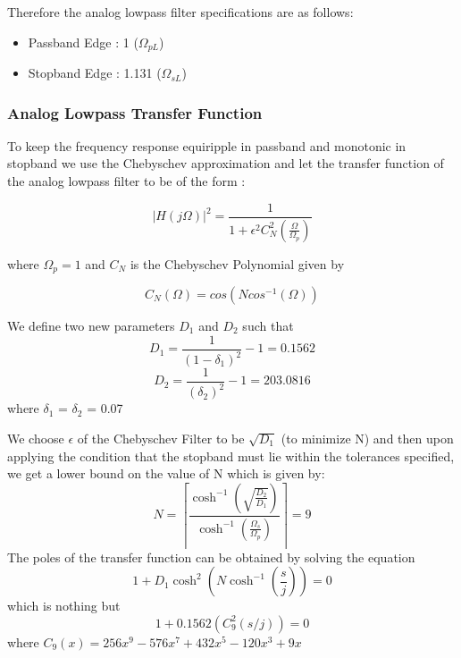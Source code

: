 \documentclass{article}
\begin{document}
\vspace{1em}
\noindent
Therefore the analog lowpass filter specifications are as follows:
\begin{itemize}
    \item Passband Edge : 1 ($\Omega_{pL}$)
    \item Stopband Edge : 1.131 ($\Omega_{sL}$)
\end{itemize}

\subsubsection{Analog Lowpass Transfer Function}
To keep the frequency response equiripple in passband and monotonic in stopband we use the Chebyschev approximation and let the transfer function of the analog lowpass filter to be of the form : 

\begin{equation*}
    |H(j\Omega)|^2 = \frac{1}{1 + \epsilon^2C^2_{N}(\frac{\Omega}{\Omega_p})}
\end{equation*}

where $\Omega_p = 1$ and $C_N$ is the Chebyschev Polynomial given by

\begin{equation*}
    C_N(\Omega) = cos(Ncos^{-1}(\Omega))
\end{equation*}

\vspace{1em}
\noindent
We define two new parameters $D_1$ and $D_2$ such that
\begin{equation*}
    D_1 = \frac{1}{(1 - \delta_1)^2} - 1 = 0.1562
\end{equation*}
\begin{equation}
    D_2 = \frac{1}{(\delta_2)^2} - 1 = 203.0816
\end{equation}
where $\delta_1$ = $\delta_2$ = 0.07

\vspace{1em}
\noindent
We choose $\epsilon$ of the Chebyschev Filter to be $\sqrt{D_1}$ (to minimize N) and then upon applying the condition that the stopband must lie within the tolerances specified, we get a lower bound on the value of N which is given by:
\begin{equation*}
    N = \left\lceil   \frac{\cosh^{-1}(\sqrt{\frac{D_2}{D_1}})}{\cosh^{-1}(\frac{\Omega_s}{\Omega_p})} \right\rceil = 9
\end{equation*}
The poles of the transfer function can be obtained by solving the equation
\begin{equation*}
    1 + D_1\cosh^2(N\cosh^{-1}(\frac{s}{j})) = 0
\end{equation*}
which is nothing but
\begin{equation*}
    1 + 0.1562(C^2_9(s/j)) = 0
\end{equation*}
where $C_9(x) = 256x^9 - 576x^7 + 432x^5 - 120x^3 + 9x$ 
\end{document}

